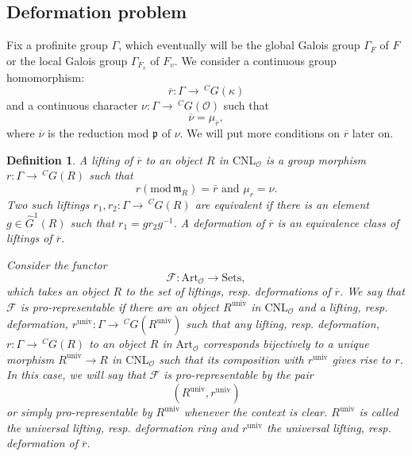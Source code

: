 \documentclass[12pt,oneside,reqno]{amsart}
\theoremstyle{plain}
\newtheorem{definition}[theorem]{Definition}
\begin{document}
	
	
	
	
	
	
	
	
	\subsection{Deformation problem}
	
	
	
	
	
	Fix a profinite group
	$\Gamma$,
	which eventually will be the global Galois group
	$\Gamma_F$ of $F$ or
	the local Galois group
	$\Gamma_{F_v}$
	of $F_v$.
	We consider a continuous group homomorphism:
	\[
	\overline{r}
	\colon
	\Gamma
	\rightarrow
	\,^CG(\kappa)
	\]
	and a continuous character $\nu\colon\Gamma\to\,^CG(\mathcal{O})$ such that
	\[
	\overline{\nu}=\mu_{\overline{r}},
	\]
	where $\overline{\nu}$ is the reduction mod $\mathfrak{p}$ of $\nu$. We will put more conditions on $\overline{r}$ later on.
	
	\begin{definition}
		A \emph{lifting} of
		$\overline{r}$ to an object
		$R$ in $\mathrm{CNL}_\mathcal{O}$
		is a group morphism
		$r\colon
		\Gamma
		\rightarrow\,
		^CG(R)$
		such that
		\[
		r(\mathrm{mod}\, \mathfrak{m}_R)
		=
		\overline{r}
		\text{ and }
		\mu_r=\nu.
		\]
		Two such liftings
		$r_1,r_2
		\colon
		\Gamma
		\rightarrow
		\,
		^CG(R)$
		are equivalent if there is an element
		$g\in
		\widehat{G}^1(R)$
		such that
		$r_1=gr_2g^{-1}$.
		A \emph{deformation}
		of $\overline{r}$ is an equivalence class of
		liftings of
		$\overline{r}$.
		
		
		
		Consider the functor
		\[
		\mathcal{F}
		\colon
		\mathrm{Art}_\mathcal{O}
		\rightarrow
		\mathrm{Sets},
		\]
		which takes an object
		$R$
		to the set of
		liftings,
		resp.
		deformations
		of $\overline{r}$.
		We say that $\mathcal{F}$
		is
		\emph{pro-representable}
		if there are an object
		$R^\mathrm{univ}$
		in
		$\mathrm{CNL}_\mathcal{O}$
		and a lifting,
		resp.
		deformation,
		$r^\mathrm{univ}
		\colon
		\Gamma
		\rightarrow
		\,^CG(R^\mathrm{univ})$
		such that 
		any
		lifting,
		resp.
		deformation,
		$r\colon
		\Gamma\rightarrow
		\,^CG(R)$
		to an object
		$R$ in $\mathrm{Art}_\mathcal{O}$
		corresponds bijectively to
		a unique morphism
		$R^\mathrm{univ}
		\rightarrow
		R$
		in
		$\mathrm{CNL}_\mathcal{O}$
		such that its composition with
		$r^\mathrm{univ}$
		gives rise to $r$.
		In this case,
		we will say that
		$\mathcal{F}$
		is pro-representable by the pair
		\[
		(R^\mathrm{univ},r^\mathrm{univ})
		\]
		or simply
		pro-representable by
		$R^\mathrm{univ}$
		whenever the context is clear.
		$R^\mathrm{univ}$
		is called the universal
		lifting,
		resp.
		deformation ring and
		$r^\mathrm{univ}$
		the universal lifting,
		resp.
		deformation
		of $\overline{r}$.
	\end{definition}
	
\end{document}
